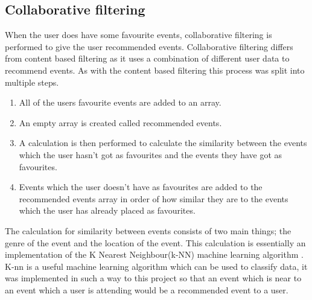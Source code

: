 \subsection{Collaborative filtering}
When the user does have some favourite events, collaborative filtering is performed to give the user recommended events. Collaborative filtering differs from content based filtering as it uses a combination of different user data to recommend events. As with the content based filtering this process was split into multiple steps.
\begin{enumerate} 
  \item All of the users favourite events are added to an array.
  \item An empty array is created called recommended events.
  \item A calculation is then performed to calculate the similarity between the events which the user hasn't got as favourites and the events they have got as favourites.
  \item Events which the user doesn't have as favourites are added to the recommended events array in order of how similar they are to the events which the user has already placed as favourites.
\end{enumerate}
The calculation for similarity between events consists of two main things; the genre of the event and the location of the event. This calculation is essentially an implementation of the K Nearest Neighbour(k-NN) machine learning algorithm \cite{knn} \cite{knn2}. K-nn is a useful machine learning algorithm which can be used to classify data, it was implemented in such a way to this project so that an event which is near to an event which a user is attending would be a recommended event to a user.

